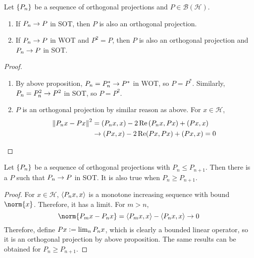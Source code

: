 \documentclass[a4paper,12pt]{article}
\begin{document}
\begin{prop}
   Let $\left\{P_n\right\}$ be a sequence of orthogonal projections and $P \in \mathcal{B}(\mathcal{H})$.
   \begin{enumerate}[label=(\arabic{*})]
       \item If $P_n \rightarrow P$ in SOT, then $P$ is also an orthogonal projection.
       \item If $P_n \rightarrow P$ in WOT and $P^2 = P$, then $P$ is also an orthogonal projection and $P_n \rightarrow P$ in SOT.
   \end{enumerate} 
\end{prop}
\begin{proof}
    \begin{enumerate}[label=(\arabic{*})]
        \item By above proposition, $P_n = P_n^* \rightarrow P^* $ in WOT, so $P = P^*$. Similarly, $P_n = P_n^2 \rightarrow P^2$ in SOT, so $P=P^2$.
        \item $P$ is an orthogonal projection by similar reason as above. For $x\in\mathcal{H}$,
        \begin{equation*}
            \begin{aligned}
                \left\|P_n x-P x\right\|^2&=\left(P_n x, x\right)-2 \operatorname{Re}\left(P_n x, P x\right)+(P x, x)\\
                & \rightarrow(P x, x)-2 \operatorname{Re}(P x, P x)+(P x, x)=0 
            \end{aligned}\qedhere
        \end{equation*}
    \end{enumerate}
\end{proof}

\begin{prop}
    Let $\left\{P_n\right\}$ be a sequence of orthogonal projections with $P_n \leq P_{n+1}$. Then there is a $P$ such that $P_n \rightarrow P$ in SOT. It is also true when $P_n \geq P_{n+1}$.
\end{prop}
\begin{proof}
    For $x \in \mathcal{H}$, $\left\langle P_nx,x \right\rangle$ is a monotone increasing sequence with bound $\norm{x}$. Therefore, it has a limit. For $m > n$,
    \begin{equation*}
        \norm{P_mx-P_nx} = \inn{P_mx,x} - \inn{P_nx,x} \sto 0
    \end{equation*}
    Therefore, define $Px \vcentcolon= \lim_n P_nx$, which is clearly a bounded linear operator, so it is an orthogonal projection by above proposition. The same results can be obtained for $P_n \geq P_{n+1}$.
\end{proof}
\end{document}
